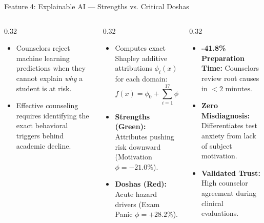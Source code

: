 \documentclass[aspectratio=169,10pt]{beamer}
\newcommand{\whybox}[2]{
  \begin{tcolorbox}[colframe=whyframe,colbacktitle=whyframe,colback=whybg,title=\textbf{WHY? The Problem \& Need (#1)}]
  \scriptsize #2
  \end{tcolorbox}
}
\newcommand{\howbox}[2]{
  \begin{tcolorbox}[colframe=howframe,colbacktitle=howframe,colback=howbg,title=\textbf{HOW? The Technology \& Algorithms (#1)}]
  \scriptsize #2
  \end{tcolorbox}
}
\newcommand{\outbox}[2]{
  \begin{tcolorbox}[colframe=outframe,colbacktitle=outframe,colback=outbg,title=\textbf{OUTCOMES? Measurable Impact \& Results (#1)}]
  \scriptsize #2
  \end{tcolorbox}
}
\begin{document}
\begin{frame}{Feature 4: Explainable AI --- Strengths vs. Critical Doshas}
\begin{columns}[T]
\begin{column}{0.32\textwidth}
\whybox{Opening the Black Box}{
\begin{itemize}
    \item Counselors reject machine learning predictions when they cannot explain \textit{why} a student is at risk.
    \item Effective counseling requires identifying the exact behavioral triggers behind academic decline.
\end{itemize}
}
\end{column}

\begin{column}{0.32\textwidth}
\howbox{Game-Theoretic SHAP}{
\begin{itemize}
    \item Computes exact Shapley additive attributions $\phi_i(x)$ for each domain:
    $$f(x) = \phi_0 + \sum_{i=1}^{17} \phi_i(x)$$
    \item \textbf{Strengths (Green):} Attributes pushing risk downward (Motivation $\phi = -21.0\%$).
    \item \textbf{Doshas (Red):} Acute hazard drivers (Exam Panic $\phi = +28.2\%$).
\end{itemize}
}
\end{column}

\begin{column}{0.32\textwidth}
\outbox{Clinical Transparency}{
\begin{itemize}
    \item \textbf{-41.8\% Preparation Time:} Counselors review root causes in $<2\text{ minutes}$.
    \item \textbf{Zero Misdiagnosis:} Differentiates test anxiety from lack of subject motivation.
    \item \textbf{Validated Trust:} High counselor agreement during clinical evaluations.
\end{itemize}
}
\end{column}
\end{columns}
\end{frame}
\end{document}
